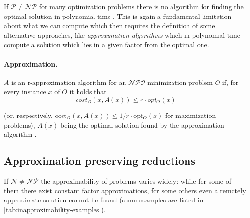If $\mathcal{P} \neq \mathcal{NP} $ for many optimization problems there is no
algorithm for finding the optimal solution in polynomial time
\cite{Trevisan2004}. This is again a fundamental limitation about what we can
compute which then requires the definition of some alternative approaches, like
\emph{approximation algorithms}
which in polynomial time
compute a solution which lies in a given factor from the optimal
one\cite{Vazirani2002}.

\paragraph{Approximation.}%
\label{par:r_approximations}

$A$ is an r-approximation algorithm for an $\mathcal{NPO} $ minimization
problem $O$ if, for every instance $x$ of $O$ it holds that
\begin{equation*}
	cost_{O} (x, A(x)) \leq r \cdot opt_{O} (x)
\end{equation*}

\noindent
(or, respectively, cost$_{O} (x, A(x))
	\leq 1/r \cdot $opt$_{O} (x) $ for maximization problems), $A(x)$ being the
optimal solution found by the approximation algorithm \cite{Trevisan2004}.

\subsection{Approximation preserving reductions}%
\label{sub:approximation_preserving_reductions}

If $\mathcal{N} \neq \mathcal{NP} $ the approximability of problems varies
widely: while for some of them there exist
constant factor approximations, for some others even a remotely approximate
solution cannot be found \cite{Ausiello2005} (some examples are listed in
\autoref{tab:inapproximability-examples}).

